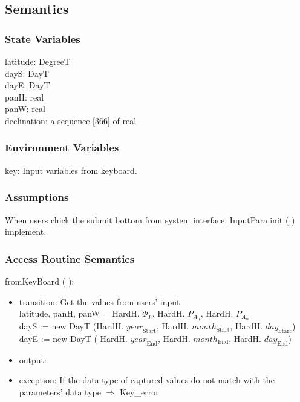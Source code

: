 \documentclass[12pt, titlepage]{article}
\begin{document}
\subsection{Semantics}

\subsubsection{State Variables}
latitude: DegreeT\\
dayS: DayT \\
dayE: DayT\\
panH: real\\
panW: real\\
declination: a sequence [366] of real


\subsubsection{Environment Variables}
key: Input variables from keyboard.

\subsubsection{Assumptions}
When users chick the submit bottom from system interface, InputPara.init ( ) implement.

\subsubsection{ Access Routine Semantics}

\noindent  fromKeyBoard ( ):
\begin{itemize}
\item transition: Get the values from users' input.\\
latitude, panH, panW = HardH. $\Phi_P$, HardH. $P_{A_{\text{h}}}$, HardH. $P_{A_{\text{w}}}$\\

dayS := new DayT (HardH. $\mathit{year}_\text{Start}$, HardH. $\mathit{month}_\text{Start}$, HardH. $\mathit{day}_\text{Start}$) \\

dayE :=  new DayT ( HardH. $\mathit{year}_\text{End}$, HardH. $\mathit{month}_\text{End}$, HardH. $\mathit{day}_\text{End}$)\\
\item output:
\item exception: If the data type of captured values do not match with the parameters' data type $\Rightarrow$ Key\_error
\end{itemize}
\end{document}
